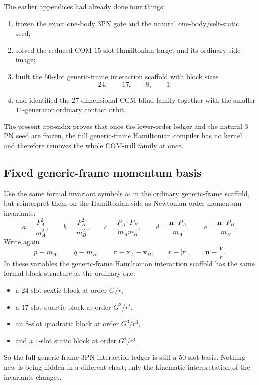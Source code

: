 \documentclass[11pt]{article}
\begin{document}
The earlier appendices had already done four things:
\begin{enumerate}
    \item frozen the exact one-body $3$PN gate and the natural one-body/self-static seed;
    \item solved the reduced COM $15$-slot Hamiltonian target and its ordinary-side image;
    \item built the $50$-slot generic-frame interaction scaffold with block sizes
    \begin{equation}
        24,\qquad 17,\qquad 8,\qquad 1;
        \label{eq:app-gfhc-block-counts-intro}
    \end{equation}
    \item and identified the $27$-dimensional COM-blind family together with the smaller
    $11$-generator ordinary contact orbit.
\end{enumerate}
The present appendix proves that once the lower-order ledger and the natural
$3$PN seed are frozen, the full generic-frame Hamiltonian compiler has no
kernel and therefore removes the whole COM-null family at once.

\subsection{Fixed generic-frame momentum basis}
\label{app:generic-frame-hamiltonian-compiler-uniqueness-basis}

Use the same formal invariant symbols as in the ordinary generic-frame
scaffold, but reinterpret them on the Hamiltonian side as Newtonian-order
momentum invariants:
\begin{equation}
 a=\frac{P_A^2}{m_A^2},
 \qquad
 b=\frac{P_B^2}{m_B^2},
 \qquad
 c=\frac{P_A\!\cdot\!P_B}{m_A m_B},
 \qquad
 d=\frac{\mathbf n\!\cdot\!P_A}{m_A},
 \qquad
 e=\frac{\mathbf n\!\cdot\!P_B}{m_B}.
\label{eq:app-gfhc-abcde}
\end{equation}
Write again
\begin{equation}
 p\equiv m_A,
 \qquad
 q\equiv m_B,
 \qquad
 \mathbf r\equiv \mathbf x_A-\mathbf x_B,
 \qquad
 r\equiv |\mathbf r|,
 \qquad
 \mathbf n\equiv \frac{\mathbf r}{r}.
\label{eq:app-gfhc-pqrn}
\end{equation}
In these variables the generic-frame Hamiltonian interaction scaffold has the
same formal block structure as the ordinary one:
\begin{itemize}
    \item a $24$-slot sextic block at order $G/r$,
    \item a $17$-slot quartic block at order $G^2/r^2$,
    \item an $8$-slot quadratic block at order $G^3/r^3$,
    \item and a $1$-slot static block at order $G^4/r^4$.
\end{itemize}
So the full generic-frame $3$PN interaction ledger is still a $50$-slot basis.
Nothing new is being hidden in a different chart; only the kinematic
interpretation of the invariants changes.
\end{document}
